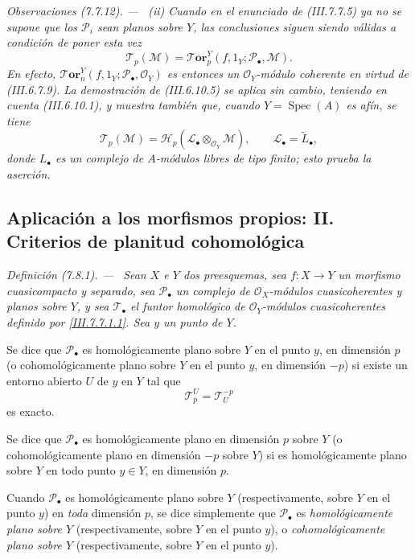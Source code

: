\documentclass[10pt,oneside]{book}
\newcommand{\sref}[2][]{\textup{(#2)}}
\newcommand{\oldpage}[2][]{\setcounter{footnote}{0}\marginpar{\scriptsize\textbf{#1}~|~#2}\ignorespaces}
\newenvironment{remarks}[1][]{\par\medskip\noindent\itshape Observaciones (#1). ---\ }{\par}
\newenvironment{definition}[1][]{\par\medskip\noindent\itshape Definición (#1). ---\ }{\par}
\begin{document}
\begin{remarks}[7.7.12]
\medskip
\textnormal{(ii)} Cuando en el enunciado de \sref{III.7.7.5} ya no se supone
que los $\mathscr P_i$ sean planos sobre $Y$, las conclusiones siguen siendo
válidas a condición de poner esta vez
\[
  \mathscr T_p(\mathscr M)
  =
  \boldsymbol{\mathscr T\!or}^Y_p
    (f,1_Y;\mathscr P_\bullet,\mathscr M).
  \tag{7.7.12.1}\label{III.7.7.12.1}
\]
En efecto,
$\boldsymbol{\mathscr T\!or}^Y_n(f,1_Y;\mathscr P_\bullet,\mathscr O_Y)$ es entonces un
$\mathscr O_Y$-módulo \emph{coherente} en virtud de \sref{III.6.7.9}. La
demostración de \sref{III.6.10.5} se aplica sin cambio, teniendo en cuenta
\sref{III.6.10.1}, y muestra también que, cuando
$Y=\operatorname{Spec}(A)$ es afín, se tiene
\[
  \mathscr T_p(\mathscr M)
  =
  \mathscr H_p(\mathscr L_\bullet\otimes_{\mathscr O_Y}\mathscr M),
  \qquad
  \mathscr L_\bullet=\widetilde{L}_\bullet,
\]
donde $L_\bullet$ es un complejo de $A$-módulos libres de tipo finito; esto
prueba la aserción.
\end{remarks}

\subsection{Aplicación a los morfismos propios: II. Criterios de planitud cohomológica}
\label{subsection:III.7.8}
\label{III.7.8}

\begin{definition}[7.8.1]
\label{III.7.8.1}
Sean $X$ e $Y$ dos preesquemas, sea $f:X\to Y$ un morfismo
cuasicompacto y separado, sea $\mathscr P_\bullet$ un complejo de
$\mathscr O_X$-módulos cuasicoherentes y planos sobre $Y$, y sea
$\mathscr T_\bullet$ el funtor homológico de $\mathscr O_Y$-módulos
cuasicoherentes definido por \eqref{III.7.7.1.1}. Sea $y$ un punto
de $Y$.

Se dice que $\mathscr P_\bullet$ es
\oldpage[III]{205}
homológicamente plano sobre
$Y$ en el punto $y$, en dimensión $p$ \textup{(o} cohomológicamente
plano sobre $Y$ en el punto $y$, en dimensión $-p$) si existe un
entorno abierto $U$ de $y$ en $Y$ tal que
\[
  \mathscr T_p^U=\mathscr T_U^{-p}
\]
es exacto.

Se dice que $\mathscr P_\bullet$ es homológicamente plano en
dimensión $p$ sobre $Y$ \textup{(o} cohomológicamente plano en
dimensión $-p$ sobre $Y$) si es homológicamente plano sobre $Y$ en
todo punto $y\in Y$, en dimensión $p$.

\upshape Cuando $\mathscr P_\bullet$ es homológicamente plano sobre $Y$
(respectivamente, sobre $Y$ en el punto $y$) en \emph{toda}
dimensión $p$, se dice simplemente que $\mathscr P_\bullet$ es
\emph{homológicamente plano sobre $Y$} (respectivamente, sobre $Y$
en el punto $y$), o \emph{cohomológicamente plano sobre $Y$}
(respectivamente, sobre $Y$ en el punto $y$).
\end{definition}
\end{document}
